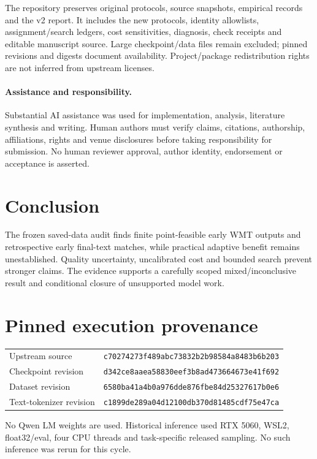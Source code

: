 \documentclass[11pt]{article}
\begin{document}
The repository preserves original protocols, source snapshots, empirical records and the v2 report. It includes the new protocols, identity allowlists, assignment/search ledgers, cost sensitivities, diagnosis, check receipts and editable manuscript source. Large checkpoint/data files remain excluded; pinned revisions and digests document availability. Project/package redistribution rights are not inferred from upstream licenses.

\paragraph{Assistance and responsibility.}
Substantial AI assistance was used for implementation, analysis, literature synthesis and writing. Human authors must verify claims, citations, authorship, affiliations, rights and venue disclosures before taking responsibility for submission. No human reviewer approval, author identity, endorsement or acceptance is asserted.

\section{Conclusion}
The frozen saved-data audit finds finite point-feasible early WMT outputs and retrospective early final-text matches, while practical adaptive benefit remains unestablished. Quality uncertainty, uncalibrated cost and bounded search prevent stronger claims. The evidence supports a carefully scoped mixed/inconclusive result and conditional closure of unsupported model work.

\appendix
\section{Pinned execution provenance}
\begin{center}\small
\begin{tabular}{@{}ll@{}}
Upstream source & \texttt{c70274273f489abc73832b2b98584a8483b6b203}\\
Checkpoint revision & \texttt{d342ce8aaea58830eef3b8ad473664673e41f692}\\
Dataset revision & \texttt{6580ba41a4b0a976dde876fbe84d25327617b0e6}\\
Text-tokenizer revision & \texttt{c1899de289a04d12100db370d81485cdf75e47ca}\\
\end{tabular}
\end{center}
No Qwen LM weights are used. Historical inference used RTX 5060, WSL2, float32/eval, four CPU threads and task-specific released sampling. No such inference was rerun for this cycle.
\end{document}
